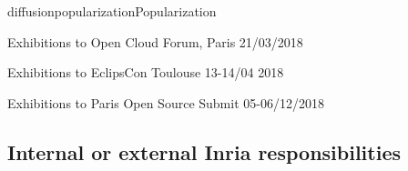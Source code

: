 \documentclass{ra2018}
\begin{document}
\begin{module}{diffusion}{popularization}{Popularization}

\begin{description}
	\item Exhibitions to Open Cloud Forum, Paris 21/03/2018
	\item Exhibitions to EclipsCon Toulouse  13-14/04 2018
	\item Exhibitions to Paris Open Source Submit 05-06/12/2018
	
\end{description}





\subsection{Internal or external Inria responsibilities}


\end{module}
\end{document}
